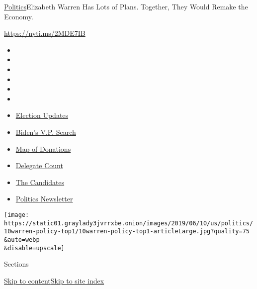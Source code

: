 \href{/section/politics}{Politics}\textbar{}Elizabeth Warren Has Lots of
Plans. Together, They Would Remake the Economy.

\url{https://nyti.ms/2MDE7IB}

\begin{itemize}
\item
\item
\item
\item
\item
\item
\end{itemize}

\begin{itemize}
\item
  \href{https://www.nytimes3xbfgragh.onion/2020/07/31/us/elections/biden-vs-trump.html?action=click\&pgtype=Article\&state=default\&region=TOP_BANNER\&context=storylines_menu}{Election
  Updates}
\item
  \href{https://www.nytimes3xbfgragh.onion/article/biden-vice-president-2020.html?action=click\&pgtype=Article\&state=default\&region=TOP_BANNER\&context=storylines_menu}{Biden's
  V.P. Search}
\item
  \href{https://www.nytimes3xbfgragh.onion/interactive/2020/07/24/us/politics/trump-biden-campaign-donors.html?action=click\&pgtype=Article\&state=default\&region=TOP_BANNER\&context=storylines_menu}{Map
  of Donations}
\item
  \href{https://www.nytimes3xbfgragh.onion/interactive/2020/us/elections/delegate-count-primary-results.html?action=click\&pgtype=Article\&state=default\&region=TOP_BANNER\&context=storylines_menu}{Delegate
  Count}
\item
  \href{https://www.nytimes3xbfgragh.onion/interactive/2019/us/politics/2020-presidential-candidates.html?action=click\&pgtype=Article\&state=default\&region=TOP_BANNER\&context=storylines_menu}{The
  Candidates}
\item
  \href{https://www.nytimes3xbfgragh.onion/newsletters/politics?action=click\&pgtype=Article\&state=default\&region=TOP_BANNER\&context=storylines_menu}{Politics
  Newsletter}
\end{itemize}

\texttt{[image: https://static01.graylady3jvrrxbe.onion/images/2019/06/10/us/politics/10warren-policy-top1/10warren-policy-top1-articleLarge.jpg?quality=75\\\&auto=webp\\\&disable=upscale]}

Sections

\protect\hyperlink{site-content}{Skip to
content}\protect\hyperlink{site-index}{Skip to site index}

